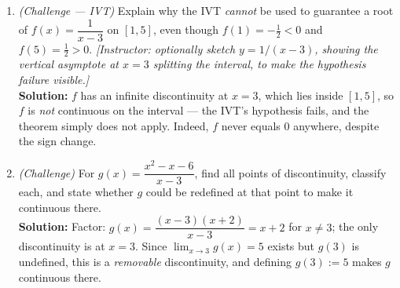 \documentclass[11pt]{article}
\begin{document}
\begin{enumerate}[leftmargin=*]
  \item \textit{(Challenge --- IVT)} Explain why the IVT \emph{cannot} be used to guarantee a root of $f(x)=\dfrac{1}{x-3}$ on $[1,5]$, even though $f(1)=-\tfrac12<0$ and $f(5)=\tfrac12>0$. \textit{[Instructor: optionally sketch $y=1/(x-3)$, showing the vertical asymptote at $x=3$ splitting the interval, to make the hypothesis failure visible.]} \\
  \textbf{Solution:} $f$ has an infinite discontinuity at $x=3$, which lies inside $[1,5]$, so $f$ is \emph{not} continuous on the interval --- the IVT's hypothesis fails, and the theorem simply does not apply. Indeed, $f$ never equals $0$ anywhere, despite the sign change.

  \item \textit{(Challenge)} For $g(x)=\dfrac{x^2-x-6}{x-3}$, find all points of discontinuity, classify each, and state whether $g$ could be redefined at that point to make it continuous there. \\
  \textbf{Solution:} Factor: $g(x)=\dfrac{(x-3)(x+2)}{x-3}=x+2$ for $x\ne 3$; the only discontinuity is at $x=3$. Since $\displaystyle\lim_{x\to 3}g(x)=5$ exists but $g(3)$ is undefined, this is a \emph{removable} discontinuity, and defining $g(3):=5$ makes $g$ continuous there.
\end{enumerate}
\end{document}

